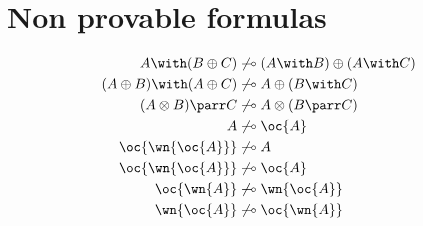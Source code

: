 \section{Non provable formulas}\label{non-provable-formulas}

\begin{align*}
A \with (B\plus C) &\not\limp (A\with B)\plus (A\with C) \\
(A\plus B)\with (A\plus C) &\not\limp A\plus (B\with C) \\
(A\tens B)\parr C &\not\limp A\tens (B\parr C) \\
A &\not\limp \oc{A} \\
\oc{\wn{\oc{A}}} &\not\limp A \\
\oc{\wn{\oc{A}}} &\not\limp \oc{A} \\
\oc{\wn{A}} &\not\limp \wn{\oc{A}} \\
\wn{\oc{A}} &\not\limp \oc{\wn{A}}
\end{align*}

